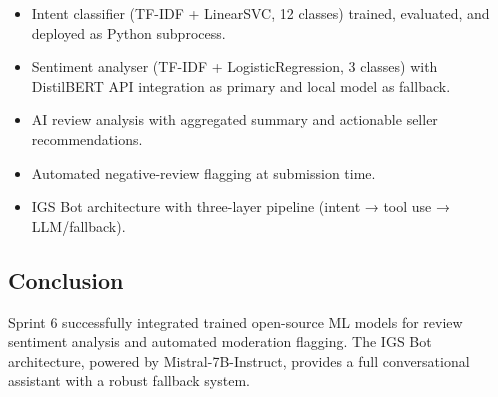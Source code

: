 \begin{itemize}
  \item Intent classifier (TF-IDF + LinearSVC, 12 classes) trained, evaluated, and deployed as Python subprocess.
  \item Sentiment analyser (TF-IDF + LogisticRegression, 3 classes) with DistilBERT API integration as primary and local model as fallback.
  \item AI review analysis with aggregated summary and actionable seller recommendations.
  \item Automated negative-review flagging at submission time.
  \item IGS Bot architecture with three-layer pipeline (intent → tool use → LLM/fallback).
\end{itemize}

\subsection*{Conclusion}
Sprint 6 successfully integrated trained open-source ML models for review sentiment analysis and automated moderation flagging. The IGS Bot architecture, powered by Mistral-7B-Instruct, provides a full conversational assistant with a robust fallback system.
